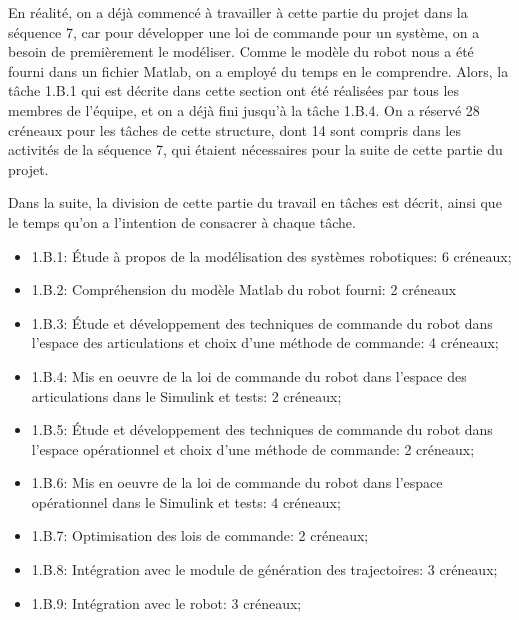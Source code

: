 
En réalité, on a déjà commencé à travailler à cette partie du projet dans la séquence 7, car pour développer une loi de commande pour un système, on a besoin de premièrement le modéliser. Comme le modèle du robot nous a été fourni dans un fichier Matlab, on a employé du temps en le comprendre. Alors, la tâche 1.B.1 qui est décrite dans cette section ont été réalisées par tous les membres de l'équipe, et on a déjà fini jusqu'à la tâche 1.B.4.
On a réservé 28 créneaux pour les tâches de cette structure, dont 14 sont compris dans les activités de la séquence 7, qui étaient nécessaires pour la suite de cette partie du projet.

Dans la suite, la division de cette partie du travail en tâches est décrit, ainsi que le temps qu'on a l'intention de consacrer à chaque tâche.

\begin{itemize}
\item 1.B.1: Étude à propos de la modélisation des systèmes robotiques: 6 créneaux;

\item 1.B.2: Compréhension du modèle Matlab du robot fourni: 2 créneaux

\item 1.B.3: Étude et développement des techniques de commande du robot dans l'espace des articulations et choix d'une méthode de commande: 4 créneaux;

\item 1.B.4: Mis en oeuvre de la loi de commande du robot dans l'espace des articulations dans le Simulink et tests: 2 créneaux;

\item 1.B.5: Étude et développement des techniques de commande du robot dans l'espace opérationnel et choix d'une méthode de commande: 2 créneaux;

\item 1.B.6: Mis en oeuvre de la loi de commande du robot dans l'espace opérationnel dans le Simulink et tests: 4 créneaux;

\item 1.B.7: Optimisation des lois de commande: 2 créneaux;

\item 1.B.8: Intégration avec le module de génération des trajectoires: 3 créneaux;

\item 1.B.9: Intégration avec le robot: 3 créneaux;

\end{itemize}
